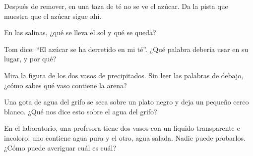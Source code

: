 \begin{exercise}[$\star$]\label{exo:g2:mixing-and-dissolving:6}
Después de remover, en una taza de té no se ve el azúcar. Da la pista
que muestra que el azúcar sigue ahí.
\end{exercise}

\begin{exercise}[$\star$]\label{exo:g2:mixing-and-dissolving:7}
En las salinas, ¿qué se lleva el sol y qué se queda?
\end{exercise}

\begin{exercise}[$\star$]\label{exo:g2:mixing-and-dissolving:8}
Tom dice: ``El azúcar se ha derretido en mi té''. ¿Qué palabra debería
usar en su lugar, y por qué?
\end{exercise}

\begin{exercise}[$\star\star$]\label{exo:g2:mixing-and-dissolving:9}
Mira la figura de los dos vasos de precipitados. Sin leer las palabras
de debajo, ¿cómo sabes qué vaso contiene la arena?
\end{exercise}

\begin{exercise}[$\star\star$]\label{exo:g2:mixing-and-dissolving:10}
Una gota de agua del grifo se seca sobre un plato negro y deja un
pequeño cerco blanco. ¿Qué nos dice esto sobre el agua del grifo?
\end{exercise}

\begin{exercise}[$\star\star$]\label{exo:g2:mixing-and-dissolving:11}
En el laboratorio, una profesora tiene dos vasos con un líquido
transparente e incoloro: uno contiene agua pura y el otro, agua salada.
Nadie puede probarlos. ¿Cómo puede averiguar cuál es cuál?
\end{exercise}
